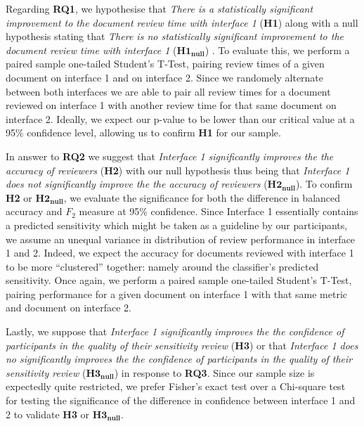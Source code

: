 \documentclass[\version]{l4proj}
\begin{document}
Regarding \textbf{RQ1}, we hypothesise that \textit{There is a statistically significant improvement to the document review time with interface 1} (\textbf{H1}) along with a null hypothesis stating that \textit{There is no statistically significant improvement to the document review time with interface 1} (\(\mathbf{H1_{null}}\)) .
To evaluate this, we perform a paired sample one-tailed Student's T-Test, pairing review times of a given document on interface 1 and on interface 2.
Since we randomely alternate between both interfaces we are able to pair all review times for a document reviewed on interface 1 with another review time for that same document on interface 2.
Ideally, we expect our p-value to be lower than our critical value at a 95\% confidence level, allowing us to confirm \textbf{H1} for our sample.

In answer to \textbf{RQ2} we suggest that \textit{Interface 1 significantly improves the the accuracy of reviewers} (\textbf{H2}) with our null hypothesis thus being that \textit{Interface 1 does not significantly improve the the accuracy of reviewers} (\(\mathbf{H2_{null}}\)).
To confirm \textbf{H2} or \(\mathbf{H2_{null}}\), we evaluate the significance for both the difference in balanced accuracy and \(F_{2}\) measure at 95\% confidence.
Since Interface 1 essentially contains a predicted sensitivity which might be taken as a guideline by our participants, we assume an unequal variance in distribution of review performance in interface 1 and 2.
Indeed, we expect the accuracy for documents reviewed with interface 1 to be more ``clustered'' together: namely around the classifier's predicted sensitivity.
Once again, we perform a paired sample one-tailed Student's T-Test, pairing performance for a given document on interface 1 with that same metric and document on interface 2.

Lastly, we suppose that \textit{Interface 1 significantly improves the the confidence of participants in the quality of their sensitivity review} (\textbf{H3}) or that \textit{Interface 1 does no significantly improves the the confidence of participants in the quality of their sensitivity review} (\(\mathbf{H3_{null}}\)) in response to \textbf{RQ3}.
Since our sample size is expectedly quite restricted, we prefer Fisher's exact test over a Chi-square test for testing the significance of the difference in confidence between interface 1 and 2 to validate \textbf{H3} or \(\mathbf{H3_{null}}\).
\end{document}
